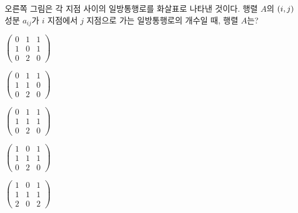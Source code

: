 \noindent\begin{minipage}[t]{0.58\linewidth}\vspace{0pt}\raggedright 오른쪽 그림은 각 지점 사이의 일방통행로를 화살표로 나타낸 것이다. 행렬 $A$의 $(i{,}\mkern3mu\mathopen{}j)$ 성분 $a_{ij}$가 $i$ 지점에서 $j$ 지점으로 가는 일방통행로의 개수일 때, 행렬 $A$는? \end{minipage}\hfill\begin{minipage}[t]{0.4\linewidth}\vspace{0pt}\centering \resizebox{\ifdim\width>\linewidth\linewidth\else\width\fi}{!}{}\end{minipage}\par
\begin{choicesii}{\rule[-4.3ex]{0pt}{10.6ex}$\begin{pmatrix} 0 & 1 & 1 \\ 1 & 0 & 1 \\ 0 & 2 & 0 \end{pmatrix}$}{\rule[-4.3ex]{0pt}{10.6ex}$\begin{pmatrix} 0 & 1 & 1 \\ 1 & 1 & 0 \\ 0 & 2 & 0 \end{pmatrix}$}{\rule[-4.3ex]{0pt}{10.6ex}$\begin{pmatrix} 0 & 1 & 1 \\ 1 & 1 & 1 \\ 0 & 2 & 0 \end{pmatrix}$}{\rule[-4.3ex]{0pt}{10.6ex}$\begin{pmatrix} 1 & 0 & 1 \\ 1 & 1 & 1 \\ 0 & 2 & 0 \end{pmatrix}$}{\rule[-4.3ex]{0pt}{10.6ex}$\begin{pmatrix} 1 & 0 & 1 \\ 1 & 1 & 1 \\ 2 & 0 & 2 \end{pmatrix}$}\end{choicesii}

